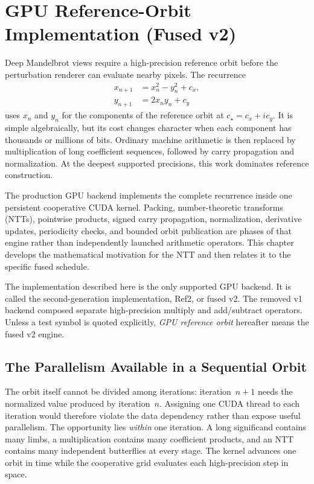 \section{GPU Reference-Orbit Implementation (Fused v2)}
\label{subsec:ref-orbit-gpu}

Deep Mandelbrot views require a high-precision reference orbit before the
perturbation renderer can evaluate nearby pixels.  The recurrence
\begin{align}
  x_{n+1} &= x_n^2-y_n^2+c_x, \\
  y_{n+1} &= 2x_ny_n+c_y
  \label{eq:gpu-reference-components}
\end{align}
uses $x_n$ and $y_n$ for the components of the reference orbit at
$c_\star=c_x+i c_y$.
It is simple algebraically, but its cost changes character when each component has
thousands or millions of bits.  Ordinary machine arithmetic is then replaced
by multiplication of long coefficient sequences, followed by carry
propagation and normalization.  At the deepest supported precisions, this work
dominates reference construction.

The production GPU backend implements the complete recurrence inside one
persistent cooperative CUDA kernel.  Packing, number-theoretic transforms
(NTTs), pointwise products, signed carry propagation, normalization, derivative
updates, periodicity checks, and bounded orbit publication are phases of that
engine rather than independently launched arithmetic operators.  This chapter
develops the mathematical motivation for the NTT and then relates it to the
specific fused schedule.

The implementation described here is the only supported GPU backend.  It is
called the second-generation implementation, Ref2, or fused v2.  The removed v1
backend composed separate high-precision multiply and add/subtract operators.
Unless a test symbol is quoted explicitly, \emph{GPU reference orbit} hereafter
means the fused v2 engine.

\subsection{The Parallelism Available in a Sequential Orbit}
\label{subsec:gpu-reference-parallelism}

The orbit itself cannot be divided among iterations: iteration~$n+1$ needs the
normalized value produced by iteration~$n$.  Assigning one CUDA thread to each
iteration would therefore violate the data dependency rather than expose useful
parallelism.  The opportunity lies \emph{within} one iteration.  A long
significand contains many limbs, a multiplication contains many coefficient
products, and an NTT contains many independent butterflies at every stage.
The kernel advances one orbit in time while the cooperative grid evaluates each
high-precision step in space.

